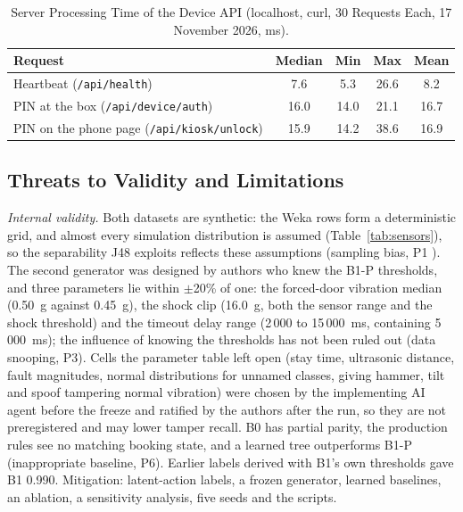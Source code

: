 \documentclass[journal,onecolumn]{IEEEtran}
\begin{document}
\begin{table}[!htbp]
\renewcommand{\arraystretch}{1.02}
\centering
\small
\caption{Server Processing Time of the Device API (localhost, curl, 30 Requests Each, 17 November 2026, ms).}
\label{tab:latency}
\vspace{5pt}
\begin{tabular}{l c c c c}
\hline
Request & Median & Min & Max & Mean \\
\hline
\rule{0pt}{2.6ex}Heartbeat (\texttt{/api/health})                     & 7.6  & 5.3  & 26.6  & 8.2 \\
PIN at the box (\texttt{/api/device/auth})           & 16.0 & 14.0 & 21.1  & 16.7 \\
PIN on the phone page (\texttt{/api/kiosk/unlock})   & 15.9 & 14.2 & 38.6  & 16.9 \\
\hline
\end{tabular}
\end{table}

\subsection{Threats to Validity and Limitations}
\label{sec:limits}

\textit{Internal validity.} Both datasets are synthetic: the Weka rows form a deterministic grid, and almost every
simulation distribution is assumed (Table~\ref{tab:sensors}), so the separability J48 exploits reflects these
assumptions (sampling bias, P1 \cite{arp2022dos}). The second generator was designed by authors who
knew the B1-P thresholds, and three parameters lie within $\pm$20\% of one: the forced-door vibration median (0.50~g
against 0.45~g), the shock clip (16.0~g, both the sensor range and the shock threshold) and the timeout
delay range (2\,000 to 15\,000~ms, containing 5\,000~ms); the influence of knowing the thresholds has not been ruled
out (data snooping, P3). Cells the parameter table left open (stay time, ultrasonic distance, fault magnitudes, normal
distributions for unnamed classes, giving hammer, tilt and spoof tampering normal vibration) were chosen by the
implementing AI agent before the freeze and ratified by the authors after the run, so they are not preregistered and may lower tamper recall. B0 has partial parity, the production rules see no matching booking state, and a learned tree outperforms B1-P (inappropriate baseline, P6). Earlier labels
derived with B1's own thresholds gave B1 0.990. Mitigation: latent-action labels, a frozen
generator, learned baselines, an ablation, a sensitivity analysis, five seeds and the scripts.
\end{document}
